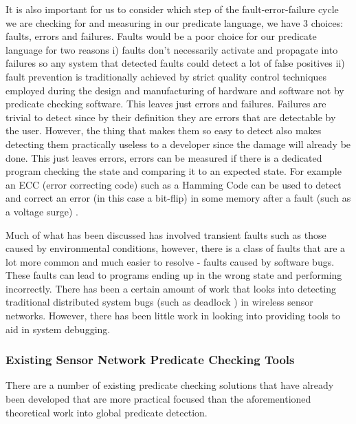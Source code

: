 It is also important for us to consider which step of the fault-error-failure cycle we are checking for and measuring in our predicate language, we have 3 choices: faults, errors and failures. Faults would be a poor choice for our predicate language for two reasons i) faults don't necessarily activate and propagate into failures so any system that detected faults could detect a lot of false positives ii) fault prevention is traditionally achieved by strict quality control techniques employed during the design and manufacturing of hardware and software\cite{dependability} not by predicate checking software. This leaves just errors and failures. Failures are trivial to detect since by their definition they are errors that are detectable by the user. However, the thing that makes them so easy to detect also makes detecting them practically useless to a developer since the damage will already be done. This just leaves errors, errors can be measured if there is a dedicated program checking the state and comparing it to an expected state. For example an ECC (error correcting code) such as a Hamming Code can be used to detect and correct an error (in this case a bit-flip) in some memory after a fault (such as a voltage surge) \cite{hamming1950error}.

Much of what has been discussed has involved transient faults such as those caused by environmental conditions, however, there is a class of faults that are a lot more common and much easier to resolve - faults caused by software bugs. These faults can lead to programs ending up in the wrong state and performing incorrectly. There has been a certain amount of work that looks into detecting traditional distributed system bugs (such as deadlock \cite{5587352,5284172}) in wireless sensor networks. However, there has been little work in looking into providing tools to aid in system debugging.

\subsubsection{Existing Sensor Network Predicate Checking Tools}

There are a number of existing predicate checking solutions that have already been developed that are more practical focused than the aforementioned theoretical work into global predicate detection.

